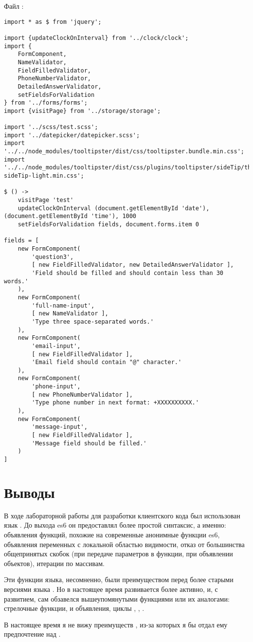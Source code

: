 \documentclass[a4paper,14pt]{extarticle}
\begin{document}
Файл :
\begin{lstlisting}
import * as $ from 'jquery';

import {updateClockOnInterval} from '../clock/clock';
import {
    FormComponent,
    NameValidator,
    FieldFilledValidator,
    PhoneNumberValidator,
    DetailedAnswerValidator,
    setFieldsForValidation
} from '../forms/forms';
import {visitPage} from '../storage/storage';

import '../scss/test.scss';
import '../datepicker/datepicker.scss';
import '../../node_modules/tooltipster/dist/css/tooltipster.bundle.min.css';
import '../../node_modules/tooltipster/dist/css/plugins/tooltipster/sideTip/themes/tooltipster-sideTip-light.min.css';

$ () ->
    visitPage 'test'
    updateClockOnInterval (document.getElementById 'date'), (document.getElementById 'time'), 1000
    setFieldsForValidation fields, document.forms.item 0

fields = [
    new FormComponent(
        'question3',
        [ new FieldFilledValidator, new DetailedAnswerValidator ],
        'Field should be filled and should contain less than 30 words.'
    ),
    new FormComponent(
        'full-name-input',
        [ new NameValidator ],
        'Type three space-separated words.'
    ),
    new FormComponent(
        'email-input',
        [ new FieldFilledValidator ],
        'Email field should contain "@" character.'
    ),
    new FormComponent(
        'phone-input',
        [ new PhoneNumberValidator ],
        'Type phone number in next format: +XXXXXXXXXX.'
    ),
    new FormComponent(
        'message-input',
        [ new FieldFilledValidator ],
        'Message field should be filled.'
    )
]
\end{lstlisting}

\section*{Выводы}
В ходе лабораторной работы для разработки клиентского кода был использован
язык . До выхода es6 он предоставлял более простой синтаксис,
а именно: объявления функций, похожие на современные анонимные функции es6,
объявления переменных с локальной областью видимости, отказ от большинства
общепринятых скобок (при передаче параметров в функции, при объявлении
объектов), итерации по массивам.

Эти функции языка, несомненно, были преимуществом перед более старыми
версиями языка . Но  в настоящее время развивается более активно,
и, с развитием, сам обзавелся вышеупомянутыми функциями или их аналогами:
стрелочные функции,  и  объявления, циклы ,
, .

В настоящее время я не вижу преимуществ , из-за которых
я бы отдал ему предпочтение над .
\end{document}

